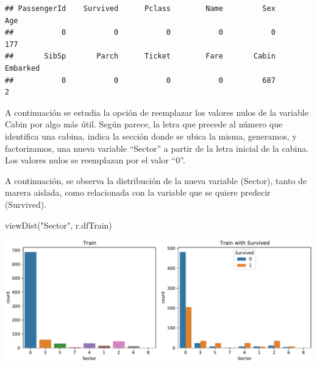 \documentclass[
]{article}
\newenvironment{Shaded}{\begin{snugshade}}{\end{snugshade}}
\newcommand{\CommentTok}[1]{\textcolor[rgb]{0.50,0.62,0.50}{#1}}
\newcommand{\DecValTok}[1]{\textcolor[rgb]{0.86,0.86,0.80}{#1}}
\newcommand{\KeywordTok}[1]{\textcolor[rgb]{0.94,0.87,0.69}{#1}}
\newcommand{\NormalTok}[1]{\textcolor[rgb]{0.80,0.80,0.80}{#1}}
\newcommand{\OperatorTok}[1]{\textcolor[rgb]{0.94,0.94,0.82}{#1}}
\newcommand{\StringTok}[1]{\textcolor[rgb]{0.80,0.58,0.58}{#1}}
\begin{document}
\begin{verbatim}
## PassengerId    Survived      Pclass        Name         Sex         Age 
##           0           0           0           0           0         177 
##       SibSp       Parch      Ticket        Fare       Cabin    Embarked 
##           0           0           0           0         687           2
\end{verbatim}

A continuación se estudia la opción de reemplazar los valores nulos de
la variable Cabin por algo más útil. Según parece, la letra que precede
al número que identifica una cabina, indica la sección donde se ubica la
misma, generamos, y factorizamos, una nueva variable ``Sector'' a partir
de la letra inicial de la cabina. Los valores nulos se reemplazan por el
valor ``0''.

\begin{Shaded}
\end{Shaded}

A continuación, se observa la distribución de la nueva variable
(Sector), tanto de marera aislada, como relacionada con la variable que
se quiere predecir (Survived).

\begin{Shaded}
\begin{Highlighting}[]
\NormalTok{viewDist(}\StringTok{"Sector"}\NormalTok{, r.dfTrain)}
\end{Highlighting}
\end{Shaded}

\includegraphics{m2851_PRA2_aruizplaza_rcotillas_files/figure-latex/unnamed-chunk-18-1.pdf}
\end{document}
